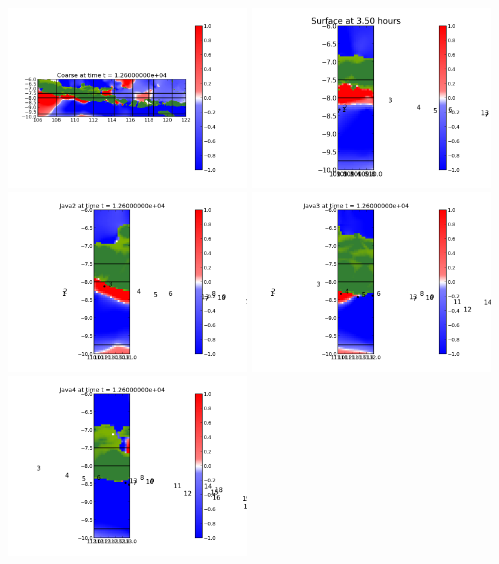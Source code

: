 \documentclass[11pt]{article}
\begin{document}
\vskip 10pt 
\includegraphics[width=0.475\textwidth]{frame0014fig0.png}
\includegraphics[width=0.475\textwidth]{frame0014fig15.png}
\vskip 10pt 
\includegraphics[width=0.475\textwidth]{frame0014fig25.png}
\includegraphics[width=0.475\textwidth]{frame0014fig20.png}
\vskip 10pt 
\includegraphics[width=0.475\textwidth]{frame0014fig30.png}
\end{document}

